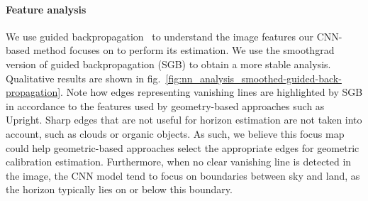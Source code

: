 \paragraph{Feature analysis} We use guided backpropagation~\cite{Springenberg2015} to understand the image features our CNN-based method focuses on to perform its estimation. We use the smoothgrad~\cite{Smilkov2017} version of guided backpropagation (SGB) to obtain a more stable analysis. Qualitative results are shown in fig.~\ref{fig:nn_analysis_smoothed-guided-back-propagation}. Note how edges representing vanishing lines are highlighted by SGB in accordance to the features used by geometry-based approaches such as Upright. Sharp edges that are not useful for horizon estimation are not taken into account, such as clouds or organic objects. As such, we believe this focus map could help geometric-based approaches select the appropriate edges for geometric calibration estimation. Furthermore, when no clear vanishing line is detected in the image, the CNN model tend to focus on boundaries between sky and land, as the horizon typically lies on or below this boundary.


